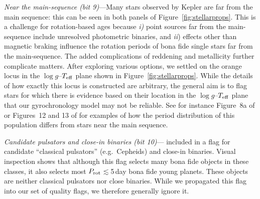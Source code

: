 \documentclass[11pt,twocolumn,tighten]{aastex63}
\begin{document}
{\it Near the main-sequence (bit 9)}---Many stars observed by Kepler
are far from the main sequence: this can be seen in both panels of
Figure~\ref{fig:stellarprops}.  This is a challenge for rotation-based
ages because {\it i)} point sources far from the main-sequence include
unresolved photometric binaries, and {\it ii}) effects other than
magnetic braking influence the rotation periods of bona fide single
stars far from the main-sequence.  The added complications of
reddening and metallicity further complicate matters.  After exploring
various options, we settled on the orange locus in the $\log
g$--$T_{\rm eff}$ plane shown in Figure~\ref{fig:stellarprops}.  While
the details of how exactly this locus is constructed are arbitrary, 
the general aim is to flag stars for which there is evidence based on
their location in the $\log g$--$T_{\rm eff}$ plane that our
gyrochronology model may not be reliable.  
See for instance Figure~8a of \citet{2022AJ....164..137K} or
Figures~12 and 13 of \citet{2023ApJS..268....4F} for examples of how
the period distribution of this population differs from stars near the
main sequence.


{\it Candidate pulsators and close-in binaries (bit
10)}---\citeauthor{Santos_2021} included in a flag for candidate
``classical pulsators'' (e.g.\ Cepheids) and
close-in binaries.  Visual inspection 
shows that although this flag selects many bona fide objects in these
classes, it also selects most $P_{\rm
rot}$$\lesssim$5\,day bona fide young planets.  
These objects are neither classical pulsators nor close
binaries.  While we propagated this flag into our set of quality
flags, we therefore generally ignore it.
\end{document}
